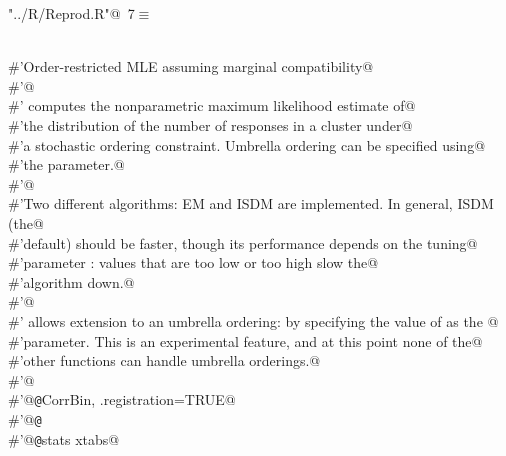 \documentclass[reqno]{amsart}
\renewcommand{\NWtarget}[2]{\hypertarget{#1}{#2}}
\begin{document}
\begin{flushleft} \small\label{scrap8}\raggedright\small
\NWtarget{nuweb7}{} \verb@"../R/Reprod.R"@\nobreak\ {\footnotesize {7}}$\equiv$
\vspace{-1ex}
\begin{list}{}{} \item
\mbox{}\verb@@\\
\mbox{}\verb@#'Order-restricted MLE assuming marginal compatibility@\\
\mbox{}\verb@#'@\\
\mbox{}\verb@#' computes the nonparametric maximum likelihood estimate of@\\
\mbox{}\verb@#'the distribution of the number of responses in a cluster  under@\\
\mbox{}\verb@#'a stochastic ordering constraint. Umbrella ordering can be specified using@\\
\mbox{}\verb@#'the  parameter.@\\
\mbox{}\verb@#'@\\
\mbox{}\verb@#'Two different algorithms: EM and ISDM are implemented. In general, ISDM (the@\\
\mbox{}\verb@#'default) should be faster, though its performance depends on the tuning@\\
\mbox{}\verb@#'parameter : values that are too low or too high slow the@\\
\mbox{}\verb@#'algorithm down.@\\
\mbox{}\verb@#'@\\
\mbox{}\verb@#' allows extension to an umbrella ordering:  by specifying the value of  as the @\\
\mbox{}\verb@#'parameter. This is an experimental feature, and at this point none of the@\\
\mbox{}\verb@#'other functions can handle umbrella orderings.@\\
\mbox{}\verb@#'@\\
\mbox{}\verb@#'@{\tt @}\verb@useDynLib CorrBin, .registration=TRUE@\\
\mbox{}\verb@#'@{\tt @}\verb@export@\\
\mbox{}\verb@#'@{\tt @}\verb@importFrom stats xtabs@\\

\end{list}
\end{flushleft}
\end{document}
